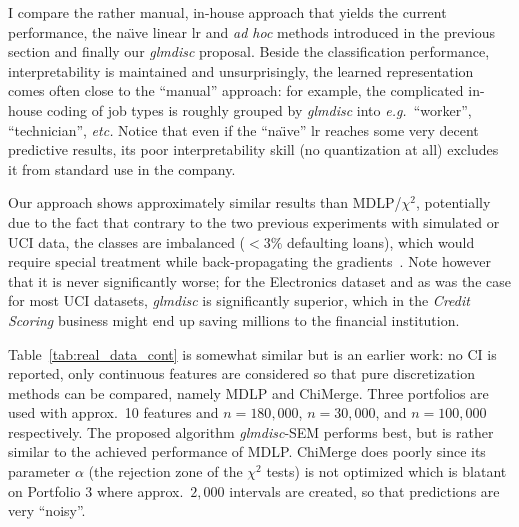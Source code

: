 I compare the rather manual, in-house approach that yields the current performance, the na\"{\i}ve linear \gls{lr} and \textit{ad hoc} methods introduced in the previous section and finally our \textit{glmdisc} proposal. Beside the classification performance, interpretability is maintained and unsurprisingly, the learned representation comes often close to the ``manual'' approach: for example, the complicated in-house coding of job types is roughly grouped by \textit{glmdisc} into \textit{e.g.}\ ``worker'', ``technician'', \textit{etc.} Notice that even if the ``na\"{\i}ve'' \gls{lr} reaches some very decent predictive results, its poor interpretability skill (no quantization at all) excludes it from standard use in the company.

Our approach shows approximately similar results than MDLP/$\chi^2$, potentially due to the fact that contrary to the two previous experiments with simulated or UCI data, the classes are imbalanced ($< 3 \%$ defaulting loans), which would require special treatment while back-propagating the gradients~\cite{anand1993improved}. Note however that it is never significantly worse; for the Electronics dataset and as was the case for most UCI datasets, \textit{glmdisc} is significantly superior, which in the \textit{Credit Scoring} business might end up saving millions to the financial institution.

Table~\ref{tab:real_data_cont} is somewhat similar but is an earlier work: no CI is reported, only continuous features are considered so that pure discretization methods can be compared, namely MDLP and ChiMerge. Three portfolios are used with approx.\ 10 features and $n = 180{,}000$, $n = 30{,}000$, and $n = 100{,}000$ respectively. The proposed algorithm \textit{glmdisc}-SEM performs best, but is rather similar to the achieved performance of MDLP. ChiMerge does poorly since its parameter $\alpha$ (the rejection zone of the $\chi^2$ tests) is not optimized which is blatant on Portfolio 3 where approx.\ $2{,}000$ intervals are created, so that predictions are very ``noisy''.


